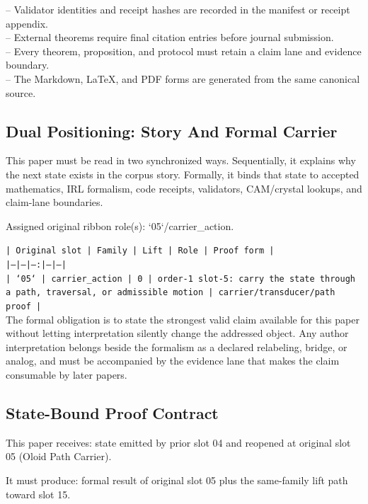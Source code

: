 \documentclass[11pt]{article}
\begin{document}
\noindent{}-- Validator identities and receipt hashes are recorded in the manifest or receipt appendix.\\
\noindent{}-- External theorems require final citation entries before journal submission.\\
\noindent{}-- Every theorem, proposition, and protocol must retain a claim lane and evidence boundary.\\
\noindent{}-- The Markdown, LaTeX, and PDF forms are generated from the same canonical source.\\

\subsection*{Dual Positioning: Story And Formal Carrier}

This paper must be read in two synchronized ways. Sequentially, it explains why
the next state exists in the corpus story. Formally, it binds that state to
accepted mathematics, IRL formalism, code receipts, validators, CAM/crystal
lookups, and claim-lane boundaries.

Assigned original ribbon role(s): `05`/carrier\_action.

\noindent\texttt{| Original slot | Family | Lift | Role | Proof form |}\\
\noindent\texttt{|---|---|---:|---|---|}\\
\noindent\texttt{| `05` | carrier\_action | 0 | order-1 slot-5: carry the state through a path, traversal, or admissible motion | carrier/transducer/path proof |}\\

The formal obligation is to state the strongest valid claim available for this
paper without letting interpretation silently change the addressed object. Any
author interpretation belongs beside the formalism as a declared relabeling,
bridge, or analog, and must be accompanied by the evidence lane that makes the
claim consumable by later papers.

\subsection*{State-Bound Proof Contract}

This paper receives: state emitted by prior slot 04 and reopened at original slot 05 (Oloid Path Carrier).

It must produce: formal result of original slot 05 plus the same-family lift path toward slot 15.
\end{document}
